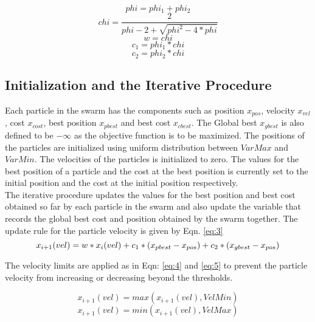 \documentclass[conference]{IEEEtran}
\begin{document}
\begin{equation}\label{eq:1}
phi = phi_1 + phi_2 
\end{equation}\label{eq:2}
\begin{equation}
chi = \frac{2}{phi - 2 + \sqrt{phi^2 - 4*phi}}
\end{equation}
\begin{equation}
w = chi
\end{equation}
\begin{equation}
c_1 = phi_1 * chi
\end{equation}
\begin{equation}
c_2 = phi_2 * chi
\end{equation}

\subsection{Initialization and the Iterative Procedure}

Each particle in the swarm has the components such as position $x_{pos}$, velocity $x_{vel}$, cost $x_{cost}$, best position $x_{pbest}$ and best cost $x_{cbest}$. The Global best $x_{gbest}$ is also defined to be $- \infty$ as the objective function is to be maximized. The positions of the particles are initialized using uniform distribution between $VarMax$ and $VarMin$. The velocities of the particles is initialized to zero. The values for the best position of a particle and the cost at the best position is currently set to the initial position and the cost at the initial position respectively. \\

The iterative procedure updates the values for the best position and best cost obtained so far by each particle in the swarm and also update the variable that records the global best cost and position obtained by the swarm together. The update rule for the particle velocity is given by Eqn. \ref{eq:3}\\

  \begin{equation}\label{eq:3}
   x_{i+1}(vel) = w * x_{i}(vel) + c_1 * (x_{pbest} - x_{pos}) + c_2 * (x_{gbest} - x_{pos})\\
  \end{equation}
  
The velocity limits are applied as in Eqn: \ref{eq:4} and \ref{eq:5} to prevent the particle velocity from increasing or decreasing beyond the thresholds.
  
  \begin{equation}\label{eq:4}
  x_{i+1}(vel) = max(x_{i+1}(vel), VelMin)
  \end{equation}
   \begin{equation}\label{eq:5}
  x_{i+1}(vel) = min(x_{i+1}(vel), VelMax)  
  \end{equation}
  
\end{document}
